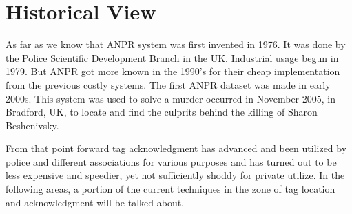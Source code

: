 
\section{Historical View}
As far as we know that ANPR system was first invented in 1976. It was done by the Police Scientific Development Branch in the UK. Industrial usage begun in 1979. But ANPR got more known in the 1990's for their cheap implementation from the previous costly systems. The first ANPR dataset was made in early 2000s. This system was used to solve a murder occurred in November 2005, in Bradford, UK, to locate and find the culprits behind the killing of Sharon Beshenivsky.

From that point forward tag acknowledgment has advanced and been utilized by police and different associations for various purposes and has turned out to be less expensive and speedier, yet not sufficiently shoddy for private utilize. In the following areas, a portion of the current techniques in the zone of tag location and acknowledgment will be talked about.